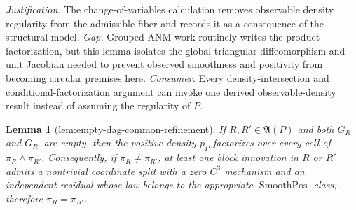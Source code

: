 \documentclass{article}
\newtheorem{lemma}{Lemma}
\begin{document}
\par\smallskip\noindent \textit{Justification.} The change-of-variables calculation removes observable density regularity from the admissible fiber and records it as a consequence of the structural model. \textit{Gap.} Grouped ANM work routinely writes the product factorization, but this lemma isolates the global triangular diffeomorphism and unit Jacobian needed to prevent observed smoothness and positivity from becoming circular premises here. \textit{Consumer.} Every density-intersection and conditional-factorization argument can invoke one derived observable-density result instead of assuming the regularity of \(P\).

\begin{lemma}[lem:empty-dag-common-refinement]\label{lem:empty-dag-common-refinement}
If \(R,R'\in\mathfrak A(P)\) and both \(G_R\) and \(G_{R'}\) are empty, then the positive density \(p_P\) factorizes over every cell of \(\pi_R\wedge\pi_{R'}\). Consequently, if \(\pi_R\neq\pi_{R'}\), at least one block innovation in \(R\) or \(R'\) admits a nontrivial coordinate split with a zero \(C^3\) mechanism and an independent residual whose law belongs to the appropriate \(\operatorname{SmoothPos}\) class; therefore \(\pi_R=\pi_{R'}\).
\end{lemma}
\end{document}
